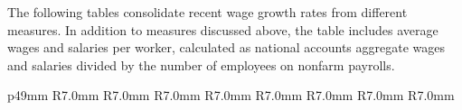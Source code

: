 \begin{minipage}{0.76\textwidth}
\small The following tables consolidate recent wage growth rates from different measures. In addition to measures discussed above, the table includes average wages and salaries per worker, calculated as national accounts aggregate wages and salaries divided by the number of employees on nonfarm payrolls. 
\vspace{0.5mm}

\vspace*{-8mm}

 \setlength{\tabcolsep}{2.5pt} \color{black!90}
{\renewcommand{\arraystretch}{1.55}
\begin{tabular}{p{49mm} R{7.0mm} R{7.0mm} R{7.0mm} R{7.0mm} R{7.0mm} 
		R{7.0mm} R{7.0mm} R{7.0mm} }
		 \hline
	\end{tabular}}
	\vspace{-1.5mm}
				
\end{minipage}
\newpage
      

